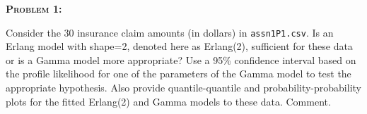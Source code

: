 \documentclass[12pt,oneside]{article}
\newenvironment{problem}[1]
{\begin{mdframed}
        \textbf{\textsc{Problem #1:}}
}
{\end{mdframed}}
\begin{document}




\begin{problem}{1}
Consider the 30 insurance claim amounts (in dollars) in \texttt{assn1P1.csv}. Is an Erlang model with shape=2, denoted here as Erlang(2), sufficient for these data or is a Gamma model more appropriate? Use a 95\% confidence interval based on the profile likelihood for one of the parameters of the Gamma model to test the appropriate hypothesis. Also provide quantile-quantile and probability-probability plots for the fitted Erlang(2) and Gamma models to these data. Comment.
\end{problem}
\end{document}
